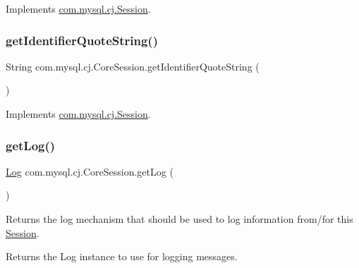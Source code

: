 Implements \mbox{\hyperlink{interfacecom_1_1mysql_1_1cj_1_1_session_a7e83fb6016b811e8bf9903c183a814ca}{com.\+mysql.\+cj.\+Session}}.

\mbox{\label{classcom_1_1mysql_1_1cj_1_1_core_session_aaefdfad2df641e33d77e2b53f855afbd}} 
\subsubsection{\texorpdfstring{get\+Identifier\+Quote\+String()}{getIdentifierQuoteString()}}
{\footnotesize\ttfamily String com.\+mysql.\+cj.\+Core\+Session.\+get\+Identifier\+Quote\+String (\begin{DoxyParamCaption}{ }\end{DoxyParamCaption})}



Implements \mbox{\hyperlink{interfacecom_1_1mysql_1_1cj_1_1_session_a5e11ee96316b575dcdf04270c90cc783}{com.\+mysql.\+cj.\+Session}}.

\mbox{\label{classcom_1_1mysql_1_1cj_1_1_core_session_ae6ee08b5d613e57d0f9e16f037ecb6cf}} 
\subsubsection{\texorpdfstring{get\+Log()}{getLog()}}
{\footnotesize\ttfamily \mbox{\hyperlink{interfacecom_1_1mysql_1_1cj_1_1log_1_1_log}{Log}} com.\+mysql.\+cj.\+Core\+Session.\+get\+Log (\begin{DoxyParamCaption}{ }\end{DoxyParamCaption})}

Returns the log mechanism that should be used to log information from/for this \mbox{\hyperlink{interfacecom_1_1mysql_1_1cj_1_1_session}{Session}}.

\begin{DoxyReturn}{Returns}
the Log instance to use for logging messages. 
\end{DoxyReturn}


